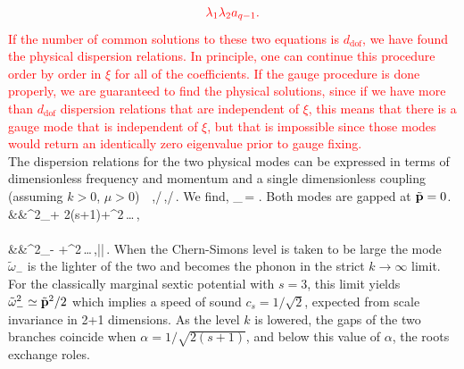\begin{align}
    \textcolor{red}{\lambda_1 \lambda_2 a_{q-1}.}
\end{align}
\textcolor{red}{If the number of common solutions to these two equations is $d_{\text{dof}}$, we have found the physical dispersion relations. In principle, one can continue this procedure order by order in $\xi$ for all of the coefficients. If the gauge procedure is done properly, we are guaranteed to find the physical solutions, since if we have more than $d_{\text{dof}}$ dispersion relations that are independent of $\xi$, this means that there is a gauge mode that is independent of $\xi$, but that is impossible since those modes would return an identically zero eigenvalue prior to gauge fixing.}\\
\indent The dispersion relations for the two physical modes can be expressed in terms of dimensionless frequency and  momentum  and a single dimensionless coupling (assuming $k>0$, $\mu>0$)
\be
\alpha\equiv\, \,,\qquad \tilde \omega\equiv\omega/\mu\,,\qquad {}/\mu\,.\label{alpha}
\ee
We find,
\be
\tilde\omega_{\pm}\,=\,\,.
\ee
Both modes are gapped at $\tilde{\bf p}=0$. 
\bea
&&\tilde\omega^2_+\,\simeq\,2(s+1)+^2\,\ldots\,, \\\nonumber \\\nonumber
&&\tilde\omega^2_-\,\simeq\,+^2\,\ldots\,,\qquad\qquad ||\,.
\eea
When the Chern-Simons level is taken to be large the mode $\tilde\omega_{-}$ is the lighter of the two and becomes the phonon in the strict $k\to\infty$ limit.
For the classically marginal sextic potential with $s=3$, this limit yields $\tilde\omega_-^2\simeq \tilde {\bf p}^2/2$ which implies a speed of sound $c_s=1/\sqrt 2$, expected from scale invariance in 2+1 dimensions. As the level $k$ is lowered, the gaps of the two branches coincide when $\alpha=1/\sqrt{2(s+1)}$, and below this value of $\alpha$, the roots exchange roles.
